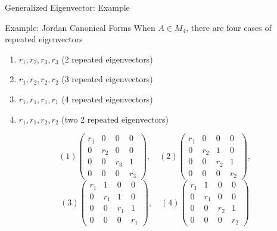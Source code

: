 \documentclass[a4paper,11pt]{article}
\begin{document}
\begin{frame}[t]{Generalized Eigenvector: Example}
	\begin{block}{Example: Jordan Canonical Forms}
		When $A\in M_4$, there are four cases of repeated eigenvectors
		\begin{enumerate}
			\item $r_1,r_2,r_3,r_3$ (2 repeated eigenvectors)
			\item $r_1,r_2,r_2,r_2$ (3 repeated eigenvectors)
			\item $r_1,r_1,r_1,r_1$ (4 repeated eigenvectors)
			\item $r_1,r_1,r_2,r_2$ (two 2 repeated eigenvectors)
		\end{enumerate}
		\[
			(1) \begin{pmatrix}
				r_1 & 0 & 0 & 0\\
				0 & r_2 & 0 & 0\\
				0 & 0 & r_3 & 1\\
				0 & 0 & 0 & r_3
			\end{pmatrix},\quad (2) \begin{pmatrix}
				r_1 & 0 & 0 & 0\\
				0 & r_2 & 1 & 0\\
				0 & 0 & r_2 & 1\\
				0 & 0 & 0 & r_2
			\end{pmatrix},
		\]\[
			(3) \begin{pmatrix}
							r_1 & 1 & 0 & 0\\
							0 & r_1 & 1 & 0\\
							0 & 0 & r_1 & 1\\
							0 & 0 & 0 & r_1
						\end{pmatrix},\quad (4)\begin{pmatrix}
							r_1 & 1 & 0 & 0\\
							0 & r_1 & 0 & 0\\
							0 & 0 & r_2 & 1\\
							0 & 0 & 0 & r_2
						\end{pmatrix}
		\]
	\end{block}
\end{frame}
\end{document}
